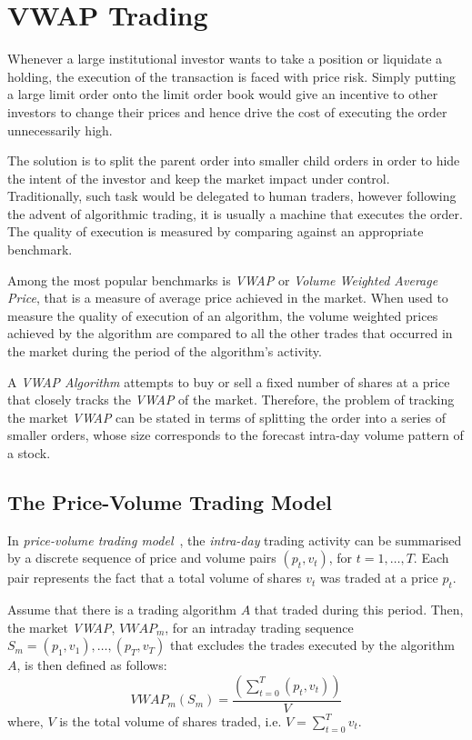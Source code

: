 \section{VWAP Trading}
Whenever a large institutional investor wants to take a position or liquidate a holding, the execution of the transaction is faced with price risk. Simply putting a large limit order onto the limit order book would give an incentive to other investors to change their prices and hence drive the cost of executing the order unnecessarily high. 

The solution is to split the parent order into smaller child orders in order to hide the intent of the investor and keep the market impact under control. Traditionally, such task would be delegated to human traders, however following the advent of algorithmic trading, it is usually a machine that executes the order. The quality of execution is measured by comparing against an appropriate benchmark.

Among the most popular benchmarks is \textit{VWAP} or \textit{Volume Weighted Average Price}, that is a measure of average price achieved in the market. When used to measure the quality of execution of an algorithm, the volume weighted prices achieved by the algorithm are compared to all the  other trades that occurred in the market during the period of the algorithm's activity. 

A \textit{VWAP Algorithm} attempts to buy or sell a fixed number of shares at a price that closely tracks the \textit{VWAP} of the market. Therefore, the problem of tracking the market \textit{VWAP} can be stated in terms of splitting the order into a series of smaller orders, whose size corresponds to the forecast intra-day volume pattern of a stock. 

\subsection{The Price-Volume Trading Model}
In \textit{price-volume trading model}~\cite{Kakade2004}, the \textit{intra-day} trading activity can be summarised by a discrete sequence of price and volume pairs $(p_t, v_t)$, for $t=1,\ldots,T$. Each pair represents the fact that a total volume of shares $v_t$ was traded at a price $p_t$. 

Assume that there is a trading algorithm $A$ that traded during this period.  Then, the market \textit{VWAP}, $VWAP_m$, for an intraday trading sequence $S_m = (p_1, v_1), \ldots, (p_T, v_T)$ that excludes the trades executed by the algorithm $A$, is then defined as follows:
\begin{equation}  
\label{Equation/Market-Vwap}
VWAP_m(S_m) = \frac{\left( \displaystyle\sum\limits_{t=0}^T (p_t, v_t) \right)}{V}
\end{equation}
where, $V$ is the total volume of shares traded, i.e. $V = \displaystyle\sum\limits_{t=0}^T v_t $. 

